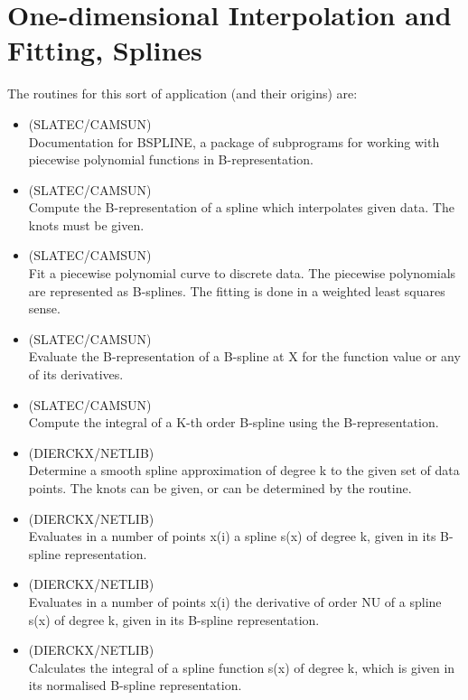 \documentclass[11pt,twoside,nolof]{starlink}
\begin{document}

\section{One-dimensional
Interpolation and Fitting, Splines}

   The routines for this sort of application (and their origins) are:

\begin{itemize}

\item {} (SLATEC/CAMSUN)\ \\
   Documentation for BSPLINE, a package of subprograms for working
   with piecewise polynomial functions in B-representation.
\item {} (SLATEC/CAMSUN)\ \\
   Compute the B-representation of a spline which interpolates given
   data. The knots must be given.
\item {} (SLATEC/CAMSUN)\ \\
   Fit a piecewise polynomial curve to discrete data. The piecewise
   polynomials are represented as B-splines. The fitting is done in a
   weighted least squares sense.
\item {} (SLATEC/CAMSUN)\ \\
   Evaluate the B-representation of a B-spline at X for the function
   value or any of its derivatives.
\item {} (SLATEC/CAMSUN)\ \\
   Compute the integral of a K-th order B-spline using the
   B-representation.

\item {} (DIERCKX/NETLIB)\ \\
   Determine a smooth spline approximation of degree k to the given
   set of data points. The knots can be given, or can be determined
   by the routine.
\item {} (DIERCKX/NETLIB)\ \\
   Evaluates in a number of points x(i) a spline s(x) of degree k,
   given in its B-spline representation.
\item {} (DIERCKX/NETLIB)\ \\
   Evaluates in a number of points x(i) the derivative of order NU of
   a spline s(x) of degree k, given in its B-spline representation.
\item {} (DIERCKX/NETLIB)\ \\
   Calculates the integral of a spline function s(x) of degree k,
   which is given in its normalised B-spline representation.


\end{itemize}
\end{document}
